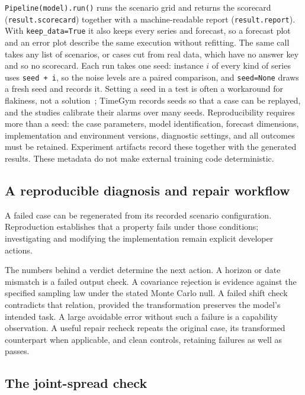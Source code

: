 \documentclass[11pt,a4paper]{article}
\newcommand{\code}[1]{\texttt{#1}}
\begin{document}
\code{Pipeline(model).run()} runs the scenario grid and returns the
scorecard (\code{result.scorecard}) together with a machine-readable report
(\code{result.report}). With \code{keep\_data=True} it also keeps every
series and forecast, so a forecast plot and an error plot describe the same
execution without refitting. The same call takes any list of scenarios, or
cases cut from real data, which have no answer key and so no scorecard.
Each run takes one seed:
instance $i$ of every kind of series uses \code{seed + i}, so the noise
levels are a paired comparison, and \code{seed=None} draws a fresh seed
and records it.
Setting a seed in a test is often a workaround for flakiness, not a
solution~\cite{dutta2022seed}; TimeGym records seeds so that a case can be
replayed, and the studies calibrate their alarms over many seeds. Reproducibility requires more than a seed: the
case parameters, model identification, forecast dimensions, implementation
and environment versions, diagnostic settings, and all outcomes must be
retained. Experiment artifacts record these together with the generated
results. These metadata do not make external training code
deterministic.

\subsection{A reproducible diagnosis and repair workflow}

A failed
case can be regenerated from its recorded scenario
configuration. Reproduction establishes that a property fails under those
conditions; investigating and modifying the implementation remain explicit
developer actions.

The numbers behind a verdict determine the next action. A horizon or date
mismatch is a failed output check. A covariance rejection is evidence
against the specified sampling law under the stated Monte Carlo null. A
failed shift check contradicts that relation, provided the
transformation preserves the model's intended task. A large avoidable
error without such a failure is a capability observation. A useful
repair recheck repeats the original case, its transformed counterpart
when applicable, and clean controls, retaining failures as well as passes.

\subsection{The joint-spread check}
\label{sec:joint-spread}
\end{document}
